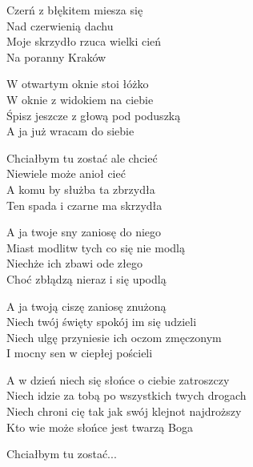 \begin{text}
    Czerń z błękitem miesza się\\
    Nad czerwienią dachu\\
    Moje skrzydło rzuca wielki cień\\
    Na poranny Kraków

    W otwartym oknie stoi łóżko\\
    W oknie z widokiem na ciebie\\
    Śpisz jeszcze z głową pod poduszką\\
    A ja już wracam do siebie

    \vin Chciałbym tu zostać ale chcieć\\
    \vin Niewiele może anioł cieć\\
    \vin A komu by służba ta zbrzydła\\
    \vin Ten spada i czarne ma skrzydła

    A ja twoje sny zaniosę do niego\\
    Miast modlitw tych co się nie modlą\\
    Niechże ich zbawi ode złego\\
    Choć zbłądzą nieraz i się upodlą

    A ja twoją ciszę zaniosę znużoną\\
    Niech twój święty spokój im się udzieli\\
    Niech ulgę przyniesie ich oczom zmęczonym\\
    I mocny sen w ciepłej pościeli

    A w dzień niech się słońce o ciebie zatroszczy\\
    Niech idzie za tobą po wszystkich twych drogach\\
    Niech chroni cię tak jak swój klejnot najdroższy\\
    Kto wie może słońce jest twarzą Boga

    \vin Chciałbym tu zostać...
\end{text}
\begin{chord}

\end{chord}